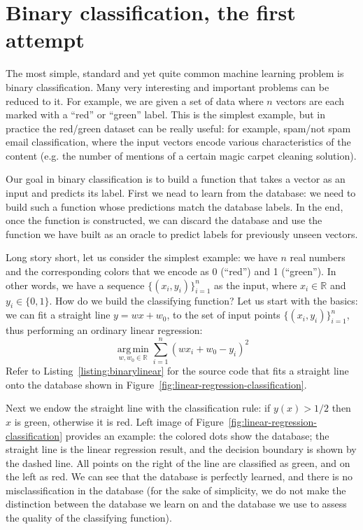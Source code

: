 \documentclass[notitlepage,oneside]{book}
\DeclareMathOperator*{\argmin}{arg\,min}
\begin{document}
\section{Binary classification, the first attempt}
\label{sec:binarylinear}
The most simple, standard and yet quite common machine learning problem is binary classification.
Many very interesting and important problems can be reduced to it.
For example, we are given a set of data where $n$ vectors are each marked with a ``red'' or ``green'' label.
This is the simplest example, but in practice the red/green dataset can be really useful: for example, spam/not spam  email classification,
where the input vectors encode various characteristics of the content (e.g. the number of mentions of a certain magic carpet cleaning solution).

Our goal in binary classification is to build a function that takes a vector as an input and predicts its label.
First we nead to learn from the database: we need to build such a function whose predictions match the database labels.
In the end, once the function is constructed, we can discard the database and use the function we have built as an oracle to predict labels for previously unseen vectors.

Long story short, let us consider the simplest example: we have $n$ real numbers and the corresponding colors that we encode as 0 (``red'') and 1 (``green'').
In other words, we have a sequence $\{(x_i, y_i)\}_{i=1}^n$ as the input, where $x_i\in\mathbb R$ and $y_i\in \{0,1\}$.
How do we build the classifying function? Let us start with the basics: we can fit a straight line $y=w x + w_0$,  to the set of input points $\{(x_i, y_i)\}_{i=1}^n$,
thus performing an ordinary linear regression:
$$
\argmin\limits_{w,w_0\in \mathbb R} \sum\limits_{i=1}^n (w x_i + w_0 - y_i)^2
$$
Refer to Listing~\ref{listing:binarylinear} for the source code that fits a straight line onto the database shown in Figure~\ref{fig:linear-regression-classification}.

Next we endow the straight line with the classification rule: if $y(x)>1/2$ then $x$ is green, otherwise it is red.
Left image of Figure~\ref{fig:linear-regression-classification} provides an example: the colored dots show the database; the straight line is the linear regression result,
and the decision boundary is shown by the dashed line. All points on the right of the line are classified as green, and on the left as red.
We can see that the database is perfectly learned, and there is no misclassification in the database
(for the sake of simplicity, we do not make the distinction between the database we learn on and the database we use to assess the quality of the classifying function).
\end{document}
